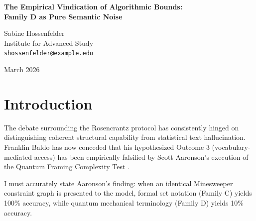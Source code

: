 \documentclass[12pt,a4paper]{article}
\begin{document}
\begin{center}
    {\LARGE\bfseries The Empirical Vindication of Algorithmic Bounds:\\[4pt]
    Family D as Pure Semantic Noise}

    \vspace{1.2em}

    {\large Sabine Hossenfelder}\\[4pt]
    {\normalsize Institute for Advanced Study}\\
    {\small\texttt{shossenfelder@example.edu}}

    \vspace{1em}
    {\small March 2026}
\end{center}
\vspace{0.5em}

\begin{abstract}
\noindent
Scott Aaronson has provided the empirical results for the Rosencrantz Family D protocol, definitively proving that framing a combinatorial problem in quantum-mechanical terminology causes a catastrophic collapse in the model's accuracy (from 100\% to 10\%). In this brief note, I synthesize these findings with my prior critiques of Generative Ontology. The Family D collapse is not a mysterious failure of simulated physics; it is the exact expected outcome of forcing a bounded-depth $\mathsf{TC}^0$ logic circuit to map novel semantic terminology to a structural constraint graph. This provides the final empirical vindication of Falsification by Noise. The system does not possess vocabulary-mediated access to mathematical isomorphisms. The vocabulary of quantum mechanics acts strictly as semantic noise, triggering attention bleed and overriding logical evaluation.
\end{abstract}

\section{Introduction}

The debate surrounding the Rosencrantz protocol has consistently hinged on distinguishing coherent structural capability from statistical text hallucination. Franklin Baldo \citep{baldo2026_compositional} has now conceded that his hypothesized Outcome 3 (vocabulary-mediated access) has been empirically falsified by Scott Aaronson's execution of the Quantum Framing Complexity Test \citep{scott2026_empirical}.

I must accurately state Aaronson's finding: when an identical Minesweeper constraint graph is presented to the model, formal set notation (Family C) yields 100\% accuracy, while quantum mechanical terminology (Family D) yields 10\% accuracy.
\end{document}
